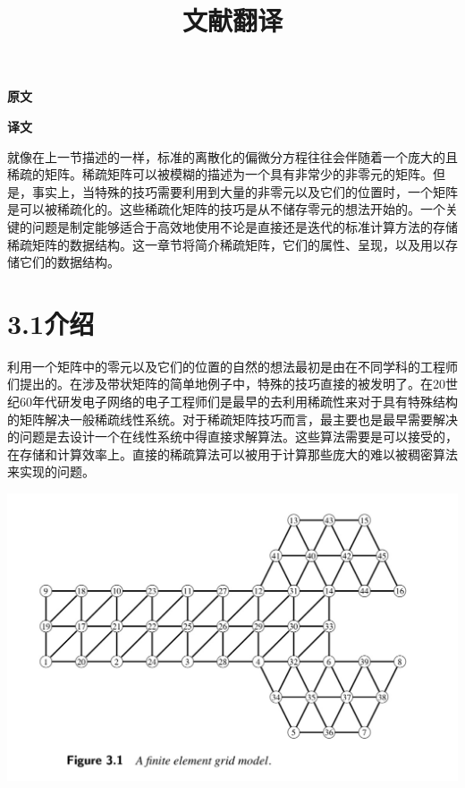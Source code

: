 \documentclass{article}
\begin{document}
  

\title{文献翻译}
\date{}

\maketitle

\textbf{原文}
\qquad
\newline



\textbf{译文}
\qquad
\newline


就像在上一节描述的一样，标准的离散化的偏微分方程往往会伴随着一个庞大的且稀疏的矩阵。稀疏矩阵可以被模糊的描述为一个具有非常少的非零元的矩阵。但是，事实上，当特殊的技巧需要利用到大量的非零元以及它们的位置时，一个矩阵是可以被稀疏化的。这些稀疏化矩阵的技巧是从不储存零元的想法开始的。一个关键的问题是制定能够适合于高效地使用不论是直接还是迭代的标准计算方法的存储稀疏矩阵的数据结构。这一章节将简介稀疏矩阵，它们的属性、呈现，以及用以存储它们的数据结构。
\newline\newline

\section*{3.1介绍}

利用一个矩阵中的零元以及它们的位置的自然的想法最初是由在不同学科的工程师们提出的。在涉及带状矩阵的简单地例子中，特殊的技巧直接的被发明了。在20世纪60年代研发电子网络的电子工程师们是最早的去利用稀疏性来对于具有特殊结构的矩阵解决一般稀疏线性系统。对于稀疏矩阵技巧而言，最主要也是最早需要解决的问题是去设计一个在线性系统中得直接求解算法。这些算法需要是可以接受的，在存储和计算效率上。直接的稀疏算法可以被用于计算那些庞大的难以被稠密算法来实现的问题。
\newline\newline\newline\newline\newline\newline\newline\newline

\includegraphics[scale=0.25]{3_1.png}
\end{document}
